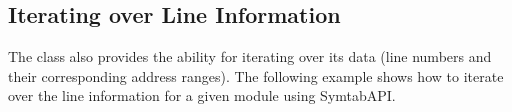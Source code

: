 \subsection{Iterating over Line Information}
\label{subsec:LineNoIterating}
The  class also provides the ability for iterating over its data (line numbers and their corresponding address ranges). The following example shows how to iterate over the line information for a given module using SymtabAPI.


